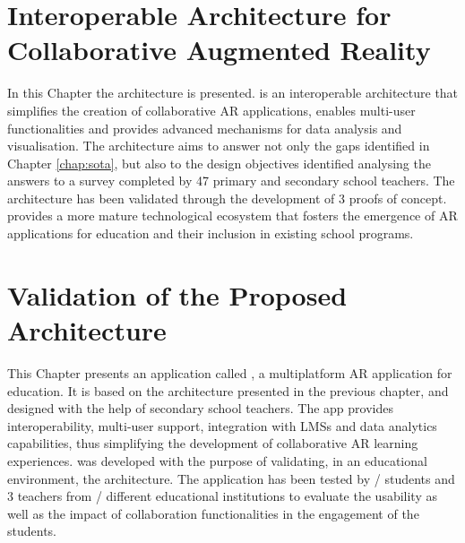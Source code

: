 




\graphicspath{{ResearchResults/figures/}{ResearchResults/figures/JPG/}{ResearchResults/figures/PDF/}{ResearchResults/figures/}{ResearchResults/figures/EPS/}}

\chapter{Interoperable Architecture for Collaborative Augmented Reality}
\label{chap:arch}

In this Chapter the \arch{} architecture is presented. \arch{} is an interoperable architecture that simplifies the creation of collaborative AR applications, enables multi-user functionalities and provides advanced mechanisms for data analysis and visualisation. The architecture aims to answer not only the gaps identified in Chapter \ref{chap:sota}, but also to the design objectives identified analysing the answers to a survey completed by 47 primary and secondary school teachers. The architecture has been validated through the development of 3 proofs of concept. \arch{} provides a more mature technological ecosystem that fosters the emergence of AR applications for education and their inclusion in existing school programs.



\chapter{Validation of the Proposed Architecture}
\label{chap:eval}

This Chapter presents an application called \appname{}, a multiplatform AR application for education. It is based on the \arch{} architecture presented in the previous chapter, and designed with the help of secondary school teachers. The app provides interoperability, multi-user support, integration with LMSs and data analytics capabilities, thus simplifying the development of collaborative AR learning experiences. \appname{} was developed with the purpose of validating, in an educational environment, the \arch{} architecture.
The application has been tested by \numstudents/ students and 3 teachers from \numschools/ different educational institutions to evaluate the usability as well as the impact of collaboration functionalities in the engagement of the students.


